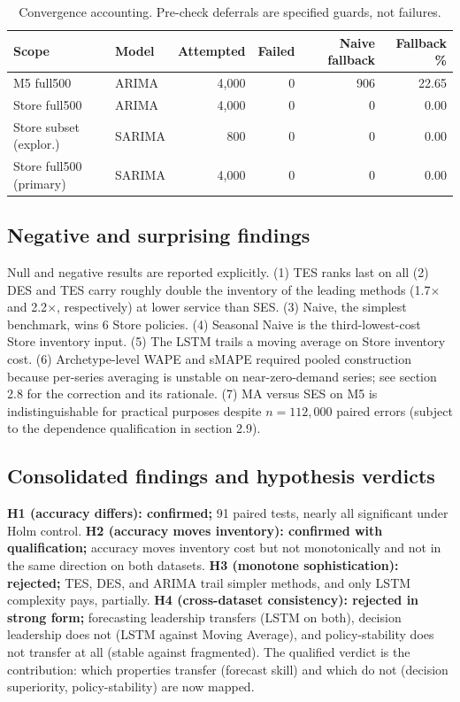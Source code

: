 \begin{table}[H]
\centering
\caption{Convergence accounting. Pre-check deferrals are specified guards, not failures.}
\label{tab:conv}
\begin{tabular}{llrrrr}
\toprule
Scope & Model & Attempted & Failed & Naive fallback & Fallback \% \\
\midrule
M5 full500 & ARIMA & 4,000 & 0 & 906 & 22.65 \\
Store full500 & ARIMA & 4,000 & 0 & 0 & 0.00 \\
Store subset (explor.) & SARIMA & 800 & 0 & 0 & 0.00 \\
Store full500 (primary) & SARIMA & 4,000 & 0 & 0 & 0.00 \\
\bottomrule
\end{tabular}
\end{table}

\subsection{Negative and surprising findings}
\label{sec:negative}
Null and negative results are reported explicitly. (1) TES ranks last on all
(2) DES and TES carry roughly double the
inventory of the leading methods (1.7$\times$ and 2.2$\times$, respectively) at lower service than SES. (3) Naive, the
simplest benchmark, wins 6 Store policies. (4) Seasonal Naive is the
third-lowest-cost Store inventory input. (5) The LSTM trails a moving average
on Store inventory cost. (6) Archetype-level WAPE and sMAPE required pooled
construction because per-series averaging is unstable on near-zero-demand
series; see section 2.8 for the correction and its rationale. (7) MA
versus SES on M5 is indistinguishable for practical purposes despite
$n=112{,}000$ paired errors (subject to the dependence qualification in
section 2.9).

\subsection{Consolidated findings and hypothesis verdicts}
\label{sec:verdicts}
\textbf{H1 (accuracy differs): confirmed;} 91 paired tests, nearly all
significant under Holm control. \textbf{H2 (accuracy moves inventory):
confirmed with qualification;} accuracy moves inventory cost but not
monotonically and not in the same direction on both datasets. \textbf{H3
(monotone sophistication): rejected;} TES, DES, and ARIMA trail simpler
methods, and only LSTM complexity pays, partially. \textbf{H4
(cross-dataset consistency): rejected in strong form;} forecasting leadership
transfers (LSTM on both), decision leadership does not (LSTM against Moving
Average), and policy-stability does not transfer at all (stable against
fragmented). The qualified verdict is the contribution: which properties
transfer (forecast skill) and which do not (decision superiority,
policy-stability) are now mapped.
